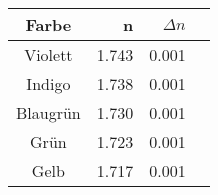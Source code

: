 \begin{tabular}{c|rrr}
Farbe &  n & $\Delta n$ \\
\hline
Violett  & 1.743 & 0.001\\
Indigo  & 1.738 & 0.001\\
Blaugrün  & 1.730 & 0.001\\
Grün  & 1.723 & 0.001\\
Gelb  & 1.717 & 0.001
\end{tabular}